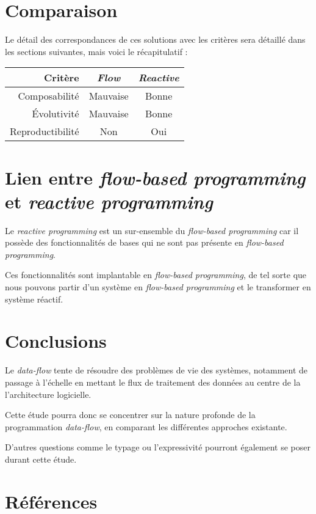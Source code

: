 \documentclass{article}
\begin{document}
\section{Comparaison}
Le détail des correspondances de ces solutions avec les critères sera détaillé
dans les sections suivantes, mais voici le récapitulatif :

\begin{center}
\begin{tabular}{r|c c}
Critère & \emph{Flow} & \emph{Reactive} \\
\hline
Composabilité & Mauvaise & Bonne \\
Évolutivité & Mauvaise & Bonne \\
Reproductibilité & Non & Oui \\
\end{tabular}
\end{center}

\section{Lien entre \emph{flow-based programming} et \emph{reactive programming}}
Le \emph{reactive programming} est un sur-ensemble du \emph{flow-based programming}
car il possède des fonctionnalités de bases qui ne sont pas présente en \emph{flow-based programming}.

Ces fonctionnalités sont implantable en \emph{flow-based programming}, de tel sorte
que nous pouvons partir d'un système en \emph{flow-based programming} et le transformer
en système réactif.

\section{Conclusions}\label{conclusions}

Le \emph{data-flow} tente de résoudre des problèmes de vie des systèmes,
notamment de passage à l'échelle en mettant le flux de traitement des données
au centre de la l'architecture logicielle.

Cette étude pourra donc se concentrer sur la nature profonde de la
programmation \emph{data-flow}, en comparant les différentes approches
existante.

D'autres questions comme le typage ou l'expressivité pourront également
se poser durant cette étude.


\section{Références}\label{références}


\end{document}

